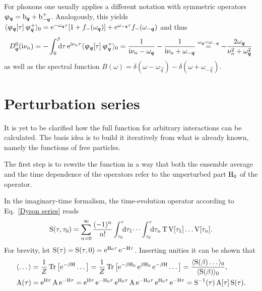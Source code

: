 For phonons one usually applies a different notation with symmetric operators
$\upvarphi_{\boldsymbol q} = \mathrm b_{\boldsymbol q} + \mathrm b_{-\boldsymbol q}^+$. Analogously, this yields
$\langle\upvarphi_{\boldsymbol q}[\tau] \, \upvarphi_{\boldsymbol q}^+\rangle_0 = \mathrm e^{-\omega_{\boldsymbol q} \tau}
[1 + f_-(\omega_{\boldsymbol q})] + \mathrm e^{\omega_{-\boldsymbol q} \tau} f_-(\omega_{-\boldsymbol q})$
and thus
%
\begin{equation} \label{D_0(i omega_n)}
    D_{\vec q}^0(\I \nu_n)
    = -\int \from 0 \till \beta \D \tau \, \E^{\I \nu_n \tau}
    \av{\upphi_{\vec q}[\tau] \, \upphi_{\vec q}^+}_0
    = \frac 1 {\I \nu_n - \omega_{\vec q}}
    - \frac 1 {\I \nu_n + \omega_{-\vec q}}
    \overset{\omega_{\vec q} = \omega_{-\vec q}} =
    -\frac{2 \omega_{\vec q}}{\nu_n^2 + \omega_{\vec q}^2}
\end{equation}
%
as well as the spectral function $B(\omega) = \delta(\omega - \omega_{\vec q}) -
\delta(\omega + \omega_{-\vec q})$.

\section{Perturbation series}

It is yet to be clarified how the full  function for arbitrary
interactions can be calculated. The basis idea is to build it iteratively from
what is already known, namely the  functions of free particles.

The first step is to rewrite the  function in a way that both the
ensemble average and the time dependence of the operators refer to the
unperturbed part $\mathrm H_0$ of the  operator.

In the imaginary-time formalism, the time-evolution operator according to
Eq.~\ref{Dyson series} reads
%
\begin{equation} \label{Matsubara-Dyson series}
    \op S(\tau, \tau_0) = \sum_{n = 0}^\infty \frac{(-1)^n}{n!}
    \int \from{\tau_0} \till \tau \D \tau_1 \dots
    \int \from{\tau_0} \till \tau \D \tau_n \,
    \op T \, \op V[\tau_1] \dots \op V[\tau_n].
\end{equation}
%
For brevity, let $\mathrm S(\tau) = \mathrm S(\tau, 0) = \mathrm e^{\mathrm H_0 \tau} \, \mathrm e^{-\mathrm H
\tau}$. Inserting unities it can be shown that
%
\begin{align*}
    \langle\dots\rangle &= \frac 1 Z \operatorname{Tr} \big[ \mathrm e^{-\beta \mathrm H} \dots \big]
    = \frac 1 Z \operatorname{Tr} \big[
        \mathrm e^{-\beta \mathrm H_0} \, \mathrm e^{\beta \mathrm H_0} \, \mathrm e^{-\beta \mathrm H} \dots
    \big]
    = \frac{\langle\mathrm S(\beta) \dots\rangle_0}{\langle\mathrm S(\beta)\rangle_0},
    \\
    \mathrm A(\tau) &= \mathrm e^{\mathrm H \tau} \, \mathrm A \, \mathrm e^{-\mathrm H \tau}
    = \mathrm e^{\mathrm H \tau} \, \mathrm e^{-\mathrm H_0 \tau} \,
    \mathrm e^{\mathrm H_0 \tau} \, \mathrm A \, \mathrm e^{-\mathrm H_0 \tau} \,
    \mathrm e^{\mathrm H_0 \tau} \, \mathrm e^{-\mathrm H \tau}
    = \mathrm S^{-1}(\tau) \, \mathrm A[\tau] \, \mathrm S(\tau).
\end{align*}

